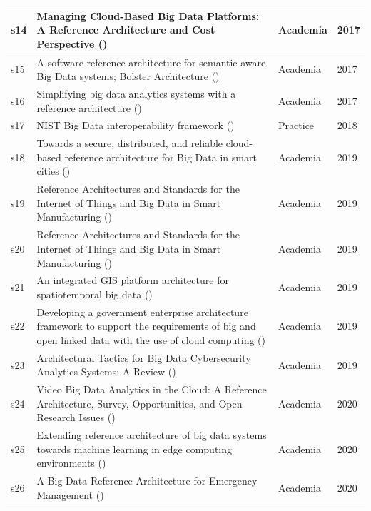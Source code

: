 \documentclass[review]{elsarticle}
\begin{document}
\begin{longtable}{ |p{0.5cm}|p{6.5cm}|p{1.5cm}|p{0.8cm}| }
    \hline
    s14 & Managing Cloud-Based Big Data Platforms: A Reference Architecture and Cost Perspective (\cite{heilig2017managing}) & Academia  &  2017   \\
    \hline
    s15 & A software reference architecture for semantic-aware Big Data systems; Bolster Architecture (\cite{Nadal}) & Academia  &  2017   \\
    \hline
    s16 & Simplifying big data analytics systems with a reference architecture (\cite{sang2017simplifying}) & Academia  &  2017   \\
    \hline
    s17 & NIST Big Data interoperability framework (\cite{Chang}) & Practice  &  2018  \\
    \hline
    s18 & Towards a secure, distributed, and reliable cloud-based reference architecture for Big Data in smart cities (\cite{Kohler})  & Academia & 2019   \\
    \hline
    s19 & Reference Architectures and Standards for the Internet of Things and Big Data in Smart Manufacturing (\cite{unal2019reference})  & Academia &  2019   \\
    \hline
    s20 & Reference Architectures and Standards for the Internet of Things and Big Data in Smart Manufacturing (\cite{unal2019reference})  & Academia & 2019   \\
    \hline
    s21 & An integrated GIS platform architecture for spatiotemporal big data (\cite{wang2019integrated})  & Academia & 2019   \\
    \hline
    s22 & Developing a government enterprise architecture framework to support the requirements of big and open linked data with the use of cloud computing (\cite{wang2019integrated})  & Academia & 2019   \\
    \hline
    s23 & Architectural Tactics for Big Data Cybersecurity Analytics Systems: A Review (\cite{ullah2019architectural})  & Academia & 2019   \\
    \hline
    s24 & Video Big Data Analytics in the Cloud: A Reference Architecture, Survey, Opportunities, and Open Research Issues (\cite{alam2020video})  & Academia & 2020   \\
    \hline
    s25 & Extending reference architecture of big data systems towards machine learning in edge computing environments (\cite{paakkonen2020extending})  & Academia & 2020   \\
    \hline
    s26 & A Big Data Reference Architecture for Emergency Management (\cite{iglesias2020big})  & Academia & 2020   \\

\end{longtable}
\end{document}
